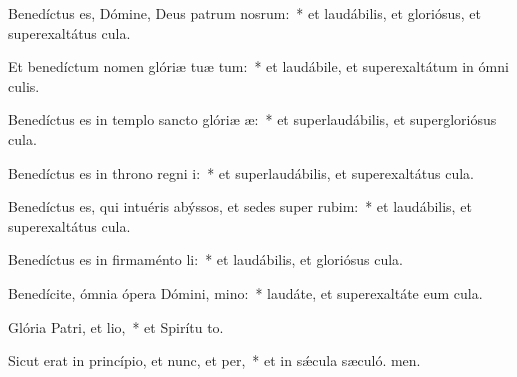 \item Benedíctus es, Dómine, Deus patrum nosrum:~* et laudábilis, et gloriósus, et superexaltátus  cula.

\item Et benedíctum nomen glóriæ tuæ tum:~* et laudábile, et superexaltátum in ómni culis.

\item Benedíctus es in templo sancto glóriæ æ:~* et superlaudábilis, et supergloriósus  cula.

\item Benedíctus es in throno regni i:~* et superlaudábilis, et superexaltátus  cula.

\item Benedíctus es, qui intuéris abýssos, et sedes super rubim:~* et laudábilis, et superexaltátus  cula.

\item Benedíctus es in firmaménto li:~* et laudábilis, et gloriósus  cula.

\item Benedícite, ómnia ópera Dómini, mino:~* laudáte, et superexaltáte eum  cula.

\item Glória Patri, et lio,~* et Spirítu to.

\item Sicut erat in princípio, et nunc, et per,~* et in sǽcula sæculó. men.